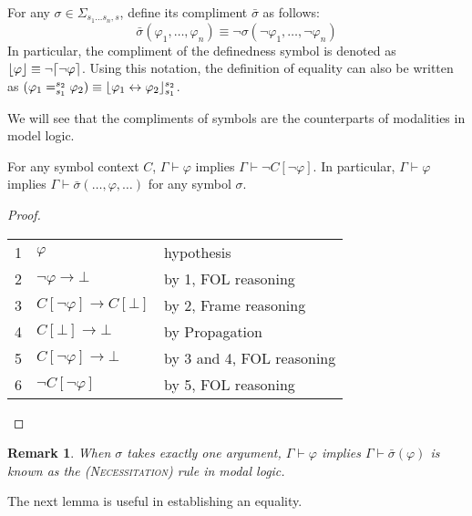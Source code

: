 \documentclass[acmsmall]{acmart}
\theoremstyle{acmdefinition}
\newtheorem{remark}{Remark}
\newcommand{\imp}{\to}
\newcommand{\dimp}{\leftrightarrow}
\newcommand{\sigmabar}{\bar{\sigma}}
\newcommand{\Cbar}{\bar{C}}
\newcommand{\prule}[1]{\textsc{(#1)}}
\newcommand{\necessitation}{\prule{Necessitation}\xspace}
\newcommand{\eframing}{Frame reasoning\xspace}
\newcommand{\epropagation}{Propagation\xspace}
\newcommand{\ddd}{,\dots,}
\DeclarePairedDelimiter{\ceil}{\lceil}{\rceil}
\DeclarePairedDelimiter{\floor}{\lfloor}{\rfloor}
\newcommand{\SigmaSub}[1]{\Sigma_{#1}}
\begin{document}
\begin{definition}
For any $\sigma \in \SigmaSub{s_1 \dots s_n, s}$,
define its compliment $\sigmabar$ as follows:
$$
\sigmabar(\varphi_1 \ddd \varphi_n) \equiv
\neg \sigma(\neg \varphi_1 \ddd \neg \varphi_n)
$$
In particular, the compliment of the definedness symbol is denoted as
$\floor{\varphi} \equiv \neg \ceil{\neg \varphi}$.
Using this notation, the definition of equality can also be written as
$(\varphi_1 =_{s_1}^{s_2} \varphi_2) \equiv 
 \floor{\varphi_1 \dimp \varphi_2}_{s_1}^{s_2} $.
\end{definition}

We will see that the compliments of symbols are the counterparts of modalities
in model logic.

\begin{lemma}
\label{lemma_necessitation}
For any symbol context $C$,
$\Gamma \vdash \varphi$ implies
$\Gamma \vdash \neg C[\neg \varphi]$.
In particular, $\Gamma \vdash \varphi$ implies
$\Gamma \vdash \sigmabar(\dots, \varphi, \dots)$
for any symbol $\sigma$.
\end{lemma}
\begin{proof}\quad
\begin{center}
\begin{tabular}{l|ll}
1 & $\varphi$ & hypothesis \\
2 & $\neg \varphi \imp \bot$ & by 1, FOL reasoning \\
3 & $C[\neg \varphi] \imp C[\bot]$ 
  & by 2, \eframing \\
4 & $C[\bot] \imp \bot$ 
  & by \epropagation \\
5 & $C[\neg \varphi] \imp \bot$
  & by 3 and 4, FOL reasoning \\
6 & $\neg C[\neg \varphi]$
  & by 5, FOL reasoning
\end{tabular}
\end{center}
\end{proof}

\begin{remark}
When $\sigma$ takes exactly one argument,
$\Gamma \vdash \varphi$ implies $\Gamma \vdash \sigmabar(\varphi)$
is known as the \necessitation rule in modal logic.
\end{remark}

The next lemma is useful in establishing an equality.
\end{document}
